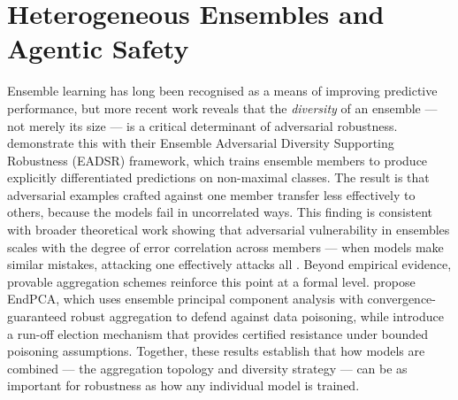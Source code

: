 \section{Heterogeneous Ensembles and Agentic Safety} \label{sec:ensembles-safety}

Ensemble learning has long been recognised as a means of improving predictive performance, but more recent work reveals that the \textit{diversity} of an ensemble --- not merely its size --- is a critical determinant of adversarial robustness. \cite{chen_diversity_2024-1} demonstrate this with their Ensemble Adversarial Diversity Supporting Robustness (EADSR) framework, which trains ensemble members to produce explicitly differentiated predictions on non-maximal classes. The result is that adversarial examples crafted against one member transfer less effectively to others, because the models fail in uncorrelated ways. This finding is consistent with broader theoretical work showing that adversarial vulnerability in ensembles scales with the degree of error correlation across members --- when models make similar mistakes, attacking one effectively attacks all \cite{pang_improving_2019, xu2023featuresqueeze}. Beyond empirical evidence, provable aggregation schemes reinforce this point at a formal level. \cite{zhang2023endpca} propose EndPCA, which uses ensemble principal component analysis with convergence-guaranteed robust aggregation to defend against data poisoning, while \cite{rezaei2022runoff} introduce a run-off election mechanism that provides certified resistance under bounded poisoning assumptions. Together, these results establish that how models are combined --- the aggregation topology and diversity strategy --- can be as important for robustness as how any individual model is trained.

